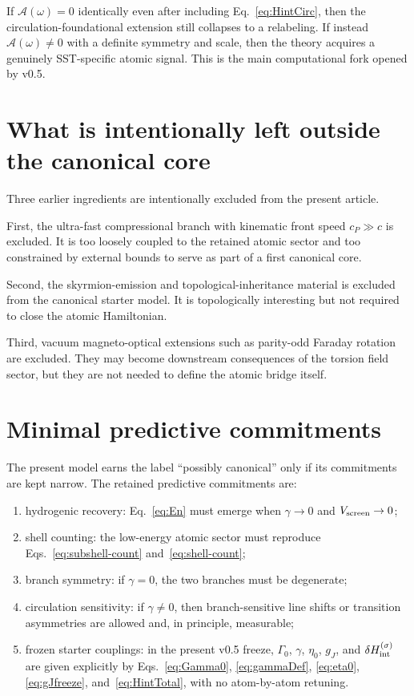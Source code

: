 \documentclass[11pt,a4paper]{article}
\begin{document}
If $\mathcal A(\omega)=0$ identically even after including Eq.~\eqref{eq:HintCirc}, then the circulation-foundational extension still collapses to a relabeling. If instead $\mathcal A(\omega)\neq 0$ with a definite symmetry and scale, then the theory acquires a genuinely SST-specific atomic signal. This is the main computational fork opened by v0.5.

\section{What is intentionally left outside the canonical core}
Three earlier ingredients are intentionally excluded from the present article.

First, the ultra-fast compressional branch with kinematic front speed $c_P\gg c$ is excluded. It is too loosely coupled to the retained atomic sector and too constrained by external bounds to serve as part of a first canonical core.

Second, the skyrmion-emission and topological-inheritance material is excluded from the canonical starter model. It is topologically interesting but not required to close the atomic Hamiltonian.

Third, vacuum magneto-optical extensions such as parity-odd Faraday rotation are excluded. They may become downstream consequences of the torsion field sector, but they are not needed to define the atomic bridge itself.

\section{Minimal predictive commitments}
The present model earns the label ``possibly canonical'' only if its commitments are kept narrow. The retained predictive commitments are:
\begin{enumerate}[label=(P\arabic*)]
    \item hydrogenic recovery: Eq.~\eqref{eq:En} must emerge when $\gamma\to 0$ and $V_{\rm screen}\to 0$;
    \item shell counting: the low-energy atomic sector must reproduce Eqs.~\eqref{eq:subshell-count} and~\eqref{eq:shell-count};
    \item branch symmetry: if $\gamma=0$, the two branches must be degenerate;
    \item circulation sensitivity: if $\gamma\neq 0$, then branch-sensitive line shifts or transition asymmetries are allowed and, in principle, measurable;
    \item frozen starter couplings: in the present v0.5 freeze, $\Gamma_0$, $\gamma$, $\eta_0$, $g_J$, and $\delta H_{\rm int}^{(\sigma)}$ are given explicitly by Eqs.~\eqref{eq:Gamma0}, \eqref{eq:gammaDef}, \eqref{eq:eta0}, \eqref{eq:gJfreeze}, and~\eqref{eq:HintTotal}, with no atom-by-atom retuning.
\end{enumerate}
\end{document}
